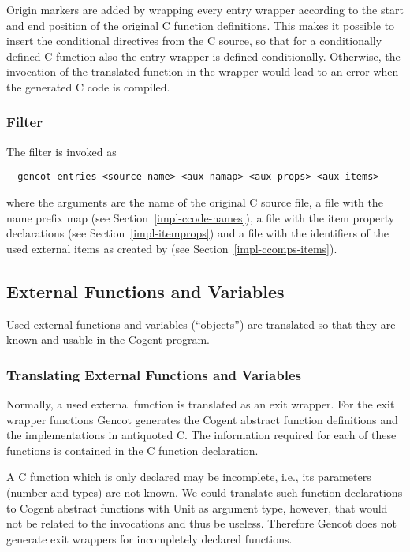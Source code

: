 Origin markers are added by wrapping every entry wrapper according to the start and end position of the 
original C function definitions. This makes it possible to insert the conditional directives from the C source,
so that for a conditionally defined C function also the entry wrapper is defined conditionally. Otherwise,
the invocation of the translated function in the wrapper would lead to an error when the generated C code
is compiled.

\subsubsection{Filter }

The filter  is invoked as
\begin{verbatim}
  gencot-entries <source name> <aux-namap> <aux-props> <aux-items>
\end{verbatim}
where the arguments are the name of the original C source file, a file  with the name prefix map 
(see Section~\ref{impl-ccode-names}), a file  with the item property declarations (see 
Section~\ref{impl-itemprops}) and a file  with the identifiers of the used external items as created 
by  (see Section~\ref{impl-ccomps-items}).

\subsection{External Functions and Variables}
\label{impl-ccomps-externs}

Used external functions and variables (``objects'') are translated so that they are known and usable
in the Cogent program.

\subsubsection{Translating External Functions and Variables}

Normally, a used external function is translated as an exit wrapper.
For the exit wrapper functions Gencot generates the Cogent abstract function definitions and the implementations
in antiquoted C. 
The information required for each of these functions is contained in the C function declaration.

A C function which is only declared may be incomplete, i.e., its parameters (number and types) are not known. 
We could translate such function declarations to Cogent abstract functions with Unit as argument type, however,
that would not be related to the invocations and thus be useless. Therefore Gencot does not generate exit 
wrappers for incompletely declared functions.

